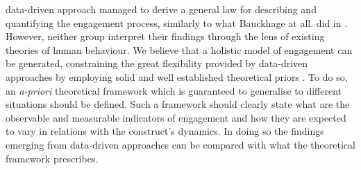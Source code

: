 data-driven approach managed to derive a general law for describing and quantifying the engagement process, similarly to what Bauckhage at all. did in \cite{bauckhage2012players}. However, neither group interpret their findings through the lens of existing theories of human behaviour. We believe that a holistic model of engagement can be generated, constraining the great flexibility provided by data-driven approaches by employing solid and well established theoretical priors \cite{yannakakis2013player}. To do so, an \textit{a-priori} theoretical framework which is guaranteed to generalise to different situations should be defined. Such a framework should clearly state what are the observable and measurable indicators of engagement and how they are expected to vary in relations with the construct's dynamics. In doing so the findings emerging from data-driven approaches can be compared with what the theoretical framework prescribes. 

